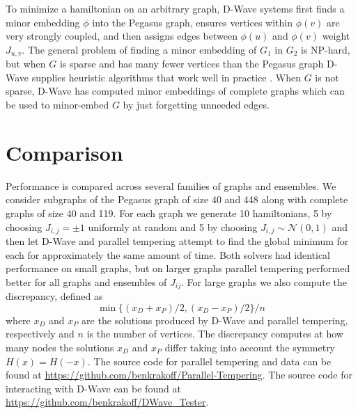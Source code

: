 \documentclass[12pt]{article}
\newcommand{\1}{\mathbf{1}}
\theoremstyle{remark}
\theoremstyle{definition}
\theoremstyle{proposition}
\theoremstyle{lemma}
\theoremstyle{definition}
\begin{document}
	To minimize a hamiltonian on an arbitrary graph, D-Wave systems first finds a minor embedding $\phi$ into the Pegasus graph, ensures vertices within $\phi(v)$ are very strongly coupled, and then assigns edges between $\phi(u)$ and $\phi(v)$ weight $J_{u, v}$. The general problem of finding a minor embedding of $G_1$ in $G_2$ is NP-hard, but when $G$ is sparse and has many fewer vertices than the Pegasus graph D-Wave supplies heuristic algorithms that work well in practice \cite{cai2014practical}. When $G$ is not sparse, D-Wave has computed minor embeddings of complete graphs which can be used to minor-embed $G$ by just forgetting unneeded edges.
	
	\section{Comparison}
	\indent \indent Performance is compared across several families of graphs and ensembles. We consider subgraphs of the Pegasus graph of size 40 and 448 along with complete graphs of size 40 and 119. For each graph we generate 10 hamiltonians, 5 by choosing $J_{i, j} = \pm 1$ uniformly at random and 5 by choosing $J_{i, j} \sim \mathcal{N}(0, 1)$ and then let D-Wave and parallel tempering attempt to find the global minimum for each for approximately the same amount of time. Both solvers had identical performance on small graphs, but on larger graphs parallel tempering performed better for all graphs and ensembles of $J_{ij}$. For large graphs we also compute the discrepancy, defined as
	$$\min \{(x_D + x_P)/2, (x_D - x_P)/2\} / n$$
	where $x_D$ and $x_P$  are the solutions produced by D-Wave and parallel tempering, respectively and $n$ is the number of vertices. The discrepancy computes at how many nodes the solutions $x_D$ and $x_P$ differ taking into account the symmetry $H(x) = H(-x)$. The source code for parallel tempering and data can be found at \url{https://github.com/benkrakoff/Parallel-Tempering}. The source code for interacting with D-Wave can be found at \url{https://github.com/benkrakoff/DWave_Tester}.
\end{document}
